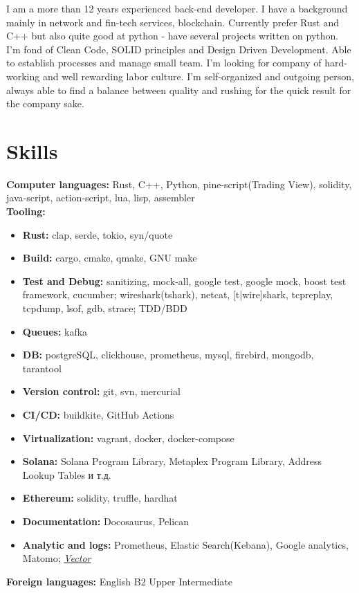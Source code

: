 \documentclass[letterpaper,11pt]{article}
\newcommand{\resumeSubHeadingListStart}{\begin{itemize}[leftmargin=0.15in, label={}]}
\newcommand{\resumeSubHeadingListEnd}{\end{itemize}}
\begin{document}
I am a more than 12 years experienced back-end developer. I have a background mainly in  network and fin-tech services, blockchain. Currently prefer Rust and C++ but also quite good at python - have several projects written on python. I'm fond of Clean Code, SOLID principles and Design Driven Development.
Able to establish processes and manage small team. I'm looking for company of hard-working and well rewarding labor culture. I'm self-organized and outgoing person, always able to find a balance between quality and rushing for the quick result for the company sake.


\section{Skills}
  \vspace{3pt}
  \resumeSubHeadingListStart
    \small{\item{
        \textbf{Computer languages:}{ Rust, C++, Python, pine-script(Trading View), solidity, java-script, action-script, lua, lisp, assembler } \\
        \textbf{Tooling: }\begin{itemize}[topsep=0pt,itemsep=0.1pt]
            \item\textbf{Rust: }{ clap, serde, tokio, syn/quote }
            \item\textbf{Build: }{ cargo, cmake, qmake, GNU make}
            \item\textbf{Test and Debug: }{ sanitizing, mock-all, google test, google mock, boost test framework, cucumber; wireshark(tshark), netcat, [t|wire]shark, tcpreplay, tcpdump, lsof, gdb, strace; TDD/BDD }
            \item\textbf{Queues: }{kafka }
            \item\textbf{DB: }{postgreSQL, clickhouse, prometheus, mysql, firebird, mongodb, tarantool }
            \item\textbf{Version control: }{git, svn, mercurial}
            \item\textbf{CI/CD: }{buildkite, GitHub Actions}
            \item\textbf{Virtualization: }{vagrant, docker, docker-compose}
            \item\textbf{Solana: }{Solana Program Library, Metaplex Program Library, Address Lookup Tables и т.д.}
            \item\textbf{Ethereum: }{solidity, truffle, hardhat}
            \item\textbf{Documentation: }{ Docosaurus, Pelican }
            \item\textbf{Analytic and logs: }{ Prometheus, Elastic Search(Kebana), Google analytics, Matomo; \emph{\href{https://vector.dev/}{\color{blue}Vector}} }
        \end{itemize}
        \textbf{Foreign languages:}{ English B2 Upper Intermediate } 
    }}
  \resumeSubHeadingListEnd
\end{document}
